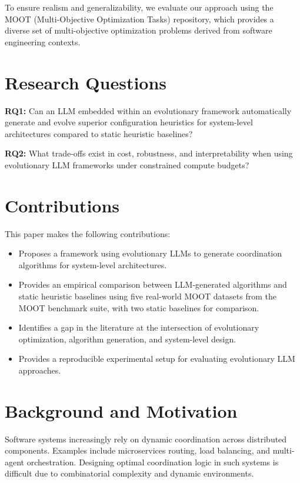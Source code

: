 \documentclass[sigconf,nonacm]{acmart}
\begin{document}
To ensure realism and generalizability, we evaluate our approach using the MOOT (Multi-Objective Optimization Tasks) repository, which provides a diverse set of multi-objective optimization problems derived from software engineering contexts.

\section{Research Questions}

\textbf{RQ1:} Can an LLM embedded within an evolutionary framework automatically generate and evolve superior configuration heuristics for system-level architectures compared to static heuristic baselines?

\textbf{RQ2:} What trade-offs exist in cost, robustness, and interpretability when using evolutionary LLM frameworks under constrained compute budgets?

\section{Contributions}

This paper makes the following contributions:
\begin{itemize}
\item Proposes a framework using evolutionary LLMs to generate coordination algorithms for system-level architectures.
\item Provides an empirical comparison between LLM-generated algorithms and static heuristic baselines using five real-world MOOT datasets from the MOOT benchmark suite, with two static baselines for comparison.
\item Identifies a gap in the literature at the intersection of evolutionary optimization, algorithm generation, and system-level design.
\item Provides a reproducible experimental setup for evaluating evolutionary LLM approaches.
\end{itemize}

\section{Background and Motivation}

Software systems increasingly rely on dynamic coordination across distributed components. Examples include microservices routing, load balancing, and multi-agent orchestration. Designing optimal coordination logic in such systems is difficult due to combinatorial complexity and dynamic environments.
\end{document}

